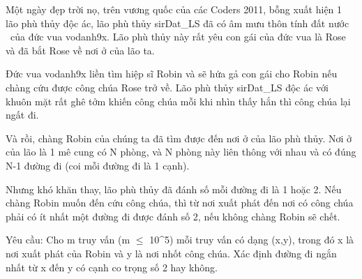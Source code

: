 Một ngày đẹp trời nọ, trên vương quốc của các Coders 2011, bỗng xuất hiện 1 lão phù thủy độc ác, lão phù thủy sirDat\_LS đã có âm mưu thôn tính đất nước  của đức vua vodanh9x. Lão phù thủy này rất yêu con gái của đức vua là Rose và đã bắt Rose về nơi ở của lão ta.

Đức vua vodanh9x liền tìm hiệp sĩ Robin và sẽ hứa gả con gái cho Robin nếu chàng cứu được công chúa Rose trở về. Lão phù thủy sirDat\_LS độc ác với khuôn mặt rất ghê tởm khiến công chúa mỗi khi nhìn thấy hắn thì công chúa lại ngất đi.

Và rồi, chàng Robin của chúng ta đã tìm được đến nơi ở của lão phù thủy. Nơi ở của lão là 1 mê cung có N phòng, và N phòng này liên thông với nhau và có đúng N-1 đường đi (coi mỗi đường đi là 1 cạnh).

Nhưng khó khăn thay, lão phù thủy đã đánh số mỗi đường đi là 1 hoặc 2. Nếu chàng Robin muốn đến cứu công chúa, thì từ nơi xuất phát đến nơi có công chúa phải có ít nhất một đường đi được đánh số 2, nếu không chàng Robin sẽ chết.

Yêu cầu: Cho m truy vấn (m  $\le$  10^5) mỗi truy vấn có dạng (x,y), trong đó x là nơi xuất phát của Robin và y là nơi nhốt công chúa. Xác định đường đi ngắn nhất từ x đến y có cạnh co trọng số 2 hay không.